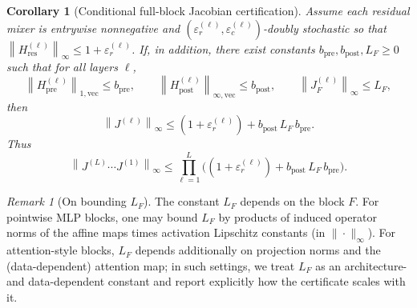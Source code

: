 \documentclass[11pt]{article}
\numberwithin{equation}{section}
\theoremstyle{plain}
\newtheorem{corollary}[theorem]{Corollary}
\theoremstyle{definition}
\theoremstyle{remark}
\newtheorem{remark}[theorem]{Remark}
\newcommand{\norm}[1]{\left\lVert #1 \right\rVert}
\newcommand{\Hres}{H_{\mathrm{res}}}
\newcommand{\Hpre}{H_{\mathrm{pre}}}
\newcommand{\Hpost}{H_{\mathrm{post}}}
\begin{document}
\begin{corollary}[Conditional full-block Jacobian certification]\label{cor:jacobian-cert}
Assume each residual mixer is entrywise nonnegative and $(\varepsilon_r^{(\ell)},\varepsilon_c^{(\ell)})$-doubly stochastic so that
$\norm{\Hres^{(\ell)}}_\infty\le 1+\varepsilon_r^{(\ell)}$. If, in addition, there exist constants
$b_{\mathrm{pre}},b_{\mathrm{post}},L_F\ge 0$ such that for all layers $\ell$,
\begin{equation}\label{eq:jac-assumptions}
\norm{\Hpre^{(\ell)}}_{1,\mathrm{vec}}\le b_{\mathrm{pre}},
\qquad
\norm{\Hpost^{(\ell)}}_{\infty,\mathrm{vec}}\le b_{\mathrm{post}},
\qquad
\norm{J_F^{(\ell)}}_\infty \le L_F,
\end{equation}
then
\begin{equation}\label{eq:jac-cert}
\norm{J^{(\ell)}}_\infty
\le
(1+\varepsilon_r^{(\ell)}) + b_{\mathrm{post}}\,L_F\,b_{\mathrm{pre}}.
\end{equation}
Thus
\begin{equation}
\norm{J^{(L)}\cdots J^{(1)}}_\infty
\le
\prod_{\ell=1}^L\Big((1+\varepsilon_r^{(\ell)}) + b_{\mathrm{post}}\,L_F\,b_{\mathrm{pre}}\Big).
\end{equation}
\end{corollary}

\begin{remark}[On bounding $L_F$]\label{rem:LF}
The constant $L_F$ depends on the block $F$. For pointwise MLP blocks, one may bound $L_F$ by products of induced operator
norms of the affine maps times activation Lipschitz constants (in $\|\cdot\|_\infty$). For attention-style blocks, $L_F$ depends
additionally on projection norms and the (data-dependent) attention map; in such settings, we treat $L_F$ as an
architecture- and data-dependent constant and report explicitly how the certificate scales with it.
\end{remark}
 
\end{document}
